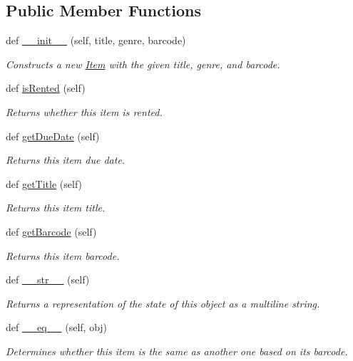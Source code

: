 \subsection*{Public Member Functions}
\begin{DoxyCompactItemize}
\item 
def \hyperlink{classAbstractItem_1_1AbstractItem_a33578b09c4f0fd29c582bdd0e0977577}{\+\_\+\+\_\+init\+\_\+\+\_\+} (self, title, genre, barcode)
\begin{DoxyCompactList}\small\item\em Constructs a new \hyperlink{namespaceItem}{Item} with the given title, genre, and barcode. \end{DoxyCompactList}\item 
def \hyperlink{classAbstractItem_1_1AbstractItem_a566051dd4f0e9b3ba3ce8214a8779244}{is\+Rented} (self)
\begin{DoxyCompactList}\small\item\em Returns whether this item is rented. \end{DoxyCompactList}\item 
def \hyperlink{classAbstractItem_1_1AbstractItem_abcf92f11f8210ca0e413dc2bc64cb6aa}{get\+Due\+Date} (self)
\begin{DoxyCompactList}\small\item\em Returns this item due date. \end{DoxyCompactList}\item 
def \hyperlink{classAbstractItem_1_1AbstractItem_a9ab1907f5110c1047957f2d1f4bebb82}{get\+Title} (self)
\begin{DoxyCompactList}\small\item\em Returns this item title. \end{DoxyCompactList}\item 
def \hyperlink{classAbstractItem_1_1AbstractItem_a9c84bde2c7eadc30f70753b8c54b6fb3}{get\+Barcode} (self)
\begin{DoxyCompactList}\small\item\em Returns this item barcode. \end{DoxyCompactList}\item 
def \hyperlink{classAbstractItem_1_1AbstractItem_ac55364df8cb3e7a488842409c372d634}{\+\_\+\+\_\+str\+\_\+\+\_\+} (self)
\begin{DoxyCompactList}\small\item\em Returns a representation of the state of this object as a multiline string. \end{DoxyCompactList}\item 
def \hyperlink{classAbstractItem_1_1AbstractItem_aaa91fe39e01044fd43770867092d45ea}{\+\_\+\+\_\+eq\+\_\+\+\_\+} (self, obj)
\begin{DoxyCompactList}\small\item\em Determines whether this item is the same as another one based on its barcode. \end{DoxyCompactList}\end{DoxyCompactItemize}
